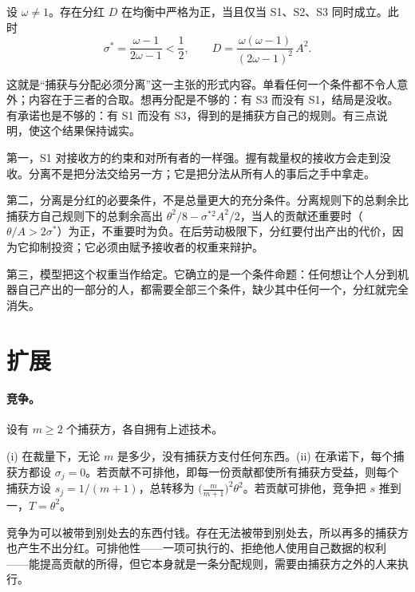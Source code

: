 \begin{proposition}[分离]\label{prop:sep}
设 $\omega\neq 1$。存在分红 $D$ 在均衡中严格为正，当且仅当 S1、S2、S3 同时成立。此时
\begin{equation}
  \sigma^*=\frac{\omega-1}{2\omega-1}<\frac12, \qquad
  D=\frac{\omega(\omega-1)}{(2\omega-1)^2}\,A^2 .
\end{equation}
\end{proposition}

这就是“捕获与分配必须分离”这一主张的形式内容。单看任何一个条件都不令人意外；内容在于三者的合取。想再分配是不够的：有 S3 而没有 S1，结局是没收。有承诺也是不够的：有 S1 而没有 S3，得到的是捕获方自己的规则。有三点说明，使这个结果保持诚实。

第一，S1 对接收方的约束和对所有者的一样强。握有裁量权的接收方会走到没收。分离不是把分法交给另一方；它是把分法从所有人的事后之手中拿走。

第二，分离是分红的必要条件，不是总量更大的充分条件。分离规则下的总剩余比捕获方自己规则下的总剩余高出 $\theta^2/8-\sigma^{*2}A^2/2$，当人的贡献还重要时（$\theta/A>2\sigma^*$）为正，不重要时为负。在后劳动极限下，分红要付出产出的代价，因为它抑制投资；它必须由赋予接收者的权重来辩护。

第三，模型把这个权重当作给定。它确立的是一个条件命题：任何想让个人分到机器自己产出的一部分的人，都需要全部三个条件，缺少其中任何一个，分红就完全消失。

\section{扩展}\label{sec:ext}

\paragraph{竞争。} 设有 $m\ge 2$ 个捕获方，各自拥有上述技术。

\begin{proposition}[竞争]\label{prop:comp}
(i) 在裁量下，无论 $m$ 是多少，没有捕获方支付任何东西。(ii) 在承诺下，每个捕获方都设
$\sigma_j=0$。若贡献不可排他，即每一份贡献都使所有捕获方受益，则每个捕获方设
$s_j=1/(m+1)$，总转移为 $\bigl(\tfrac{m}{m+1}\bigr)^2\theta^2$。若贡献可排他，竞争把
$s$ 推到一，$T=\theta^2$。
\end{proposition}

竞争为可以被带到别处去的东西付钱。存在无法被带到别处去，所以再多的捕获方也产生不出分红。可排他性——一项可执行的、拒绝他人使用自己数据的权利
\citep{ArrietaIbarra2018,JonesTonetti2020}——能提高贡献的所得，但它本身就是一条分配规则，需要由捕获方之外的人来执行。


